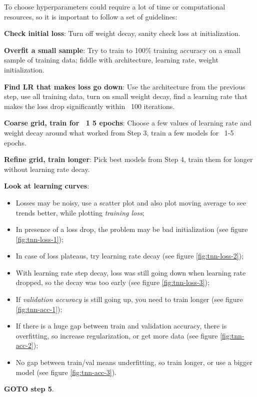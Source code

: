 To choose hyperparameters could require a lot of time or computational resources, so it is important to follow a set of guidelines:
\begin{myenum}
    \item \textbf{Check initial loss}: Turn off weight decay, sanity check loss at initialization.
    \item \textbf{Overfit a small sample}: Try to train to 100\% training accuracy on a small sample of training data; fiddle with architecture, learning rate, weight initialization.
    \item \textbf{Find LR that makes loss go down}: Use the architecture from the previous step, use all training data, turn on small weight decay, find a learning rate that makes the loss drop significantly within ~100 iterations.
    \item \textbf{Coarse grid, train for ~1 5 epochs}: Choose a few values of learning rate and weight decay around what worked from Step 3, train a few models for ~1-5 epochs.
    \item \textbf{Refine grid, train longer}: Pick best models from Step 4, train them for longer without learning rate decay.
    \item \textbf{Look at learning curves}:
    \begin{itemize}
        \item Losses may be noisy, use a scatter plot and also plot moving average to see trends better, while plotting \textit{training loss};
        \item In presence of a loss drop, the problem may be bad initialization (see figure \ref{fig:tnn-loss-1});
        \item In case of loss plateaus, try learning rate decay (see figure \ref{fig:tnn-loss-2});
        \item With learning rate step decay, loss was still going down when learning rate dropped, so the decay was too early (see figure \ref{fig:tnn-loss-3});
        \item If \textit{validation accuracy} is still going up, you need to train longer (see figure \ref{fig:tnn-acc-1});
        \item If there is a huge gap between train and validation accuracy, there is overfitting, so increase regularization, or get more data (see figure \ref{fig:tnn-acc-2});
        \item No gap between train/val means underfitting, so train longer, or use a bigger model (see figure \ref{fig:tnn-acc-3}).
    \end{itemize}
    \item \textbf{GOTO step 5}.
\end{myenum}


